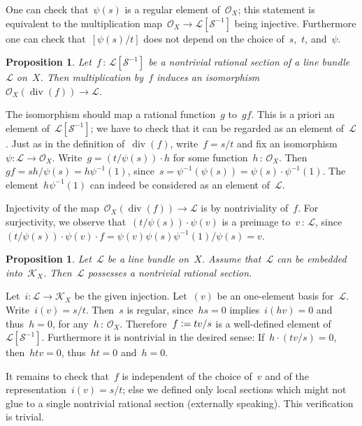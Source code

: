 \documentclass[10pt,reqno,a4paper]{amsbook}
\makeatletter
\theoremstyle{definition}
\theoremstyle{plain}
\newtheorem{prop}[defn]{Proposition}
\theoremstyle{remark}
\renewcommand{\O}{\mathcal{O}}
\newcommand{\K}{\mathcal{K}}
\renewcommand{\L}{\mathcal{L}}
\renewcommand{\S}{\mathcal{S}}
\newcommand{\?}{\,{:}\,}
\renewcommand{\_}{\mathpunct{.}\,}
\newcommand{\defeq}{\vcentcolon=}
\renewenvironment{proof}[1][\proofname]{\par
  \pushQED{\qed}%
  \normalfont \topsep6\p@\@plus6\p@\relax
  \trivlist
  \item[\hskip\labelsep
        \itshape
    #1\@addpunct{.}]\ignorespaces
}{%
  \popQED\endtrivlist\@endpefalse
}
\makeatother
\begin{document}
One can check that~$\psi(s)$ is a regular element of~$\O_X$; this statement is
equivalent to the multiplication map~$\O_X \to \L[\S^{-1}]$ being
injective. Furthermore one can check that~$[\psi(s)/t]$ does not depend on the
choice of~$s$,~$t$, and~$\psi$.

\begin{prop}Let~$f\?\L[\S^{-1}]$ be a nontrivial rational section of a line
bundle~$\L$ on~$X$. Then multiplication by~$f$ induces an
isomorphism~$\O_X(\operatorname{div}(f)) \to \L$.\end{prop}
\begin{proof}The isomorphism should map a rational function~$g$ to~$g f$. This
is a priori an element of~$\L[\S^{-1}]$; we have to check that it can be
regarded as an element of~$\L$. Just as in the definition
of~$\operatorname{div}(f)$, write~$f = s/t$ and fix an isomorphism~$\psi : \L
\to \O_X$. Write~$g = (t/\psi(s)) \cdot h$ for some function~$h\?\O_X$. Then~$g
f = sh/\psi(s) = h\psi^{-1}(1)$, since~$s = \psi^{-1}(\psi(s)) = \psi(s)
\cdot \psi^{-1}(1)$. The element~$h\psi^{-1}(1)$ can indeed be considered as an
element of~$\L$.

Injectivity of the map~$\O_X(\operatorname{div}(f)) \to \L$ is by
nontriviality of~$f$. For surjectivity, we observe that~$(t/\psi(s)) \cdot \psi(v)$ is a
preimage to~$v\?\L$, since~$(t/\psi(s)) \cdot \psi(v) \cdot f = \psi(v) \psi(s)
\psi^{-1}(1) / \psi(s) = v$.
\end{proof}

\begin{prop}Let~$\L$ be a line bundle on~$X$. Assume that~$\L$ can be embedded
into~$\K_X$. Then~$\L$ possesses a nontrivial rational section.
\end{prop}
\begin{proof}Let~$i : \L \to \K_X$ be the given injection. Let~$(v)$ be an
one-element basis for~$\L$. Write~$i(v) = s/t$. Then~$s$ is regular,
since~$hs = 0$ implies~$i(hv) = 0$ and thus~$h = 0$, for any~$h\?\O_X$.
Therefore~$f \defeq tv/s$ is a well-defined element of~$\L[\S^{-1}]$.
Furthermore it is nontrivial in the desired sense: If~$h \cdot (tv/s) = 0$,
then~$htv = 0$, thus~$ht = 0$ and~$h = 0$.

It remains to check that~$f$ is independent of the choice of~$v$ and of the
representation~$i(v) = s/t$; else we defined only local sections which might not
glue to a single nontrivial rational section (externally speaking). This verification is
trivial.
\end{proof}
\end{document}
